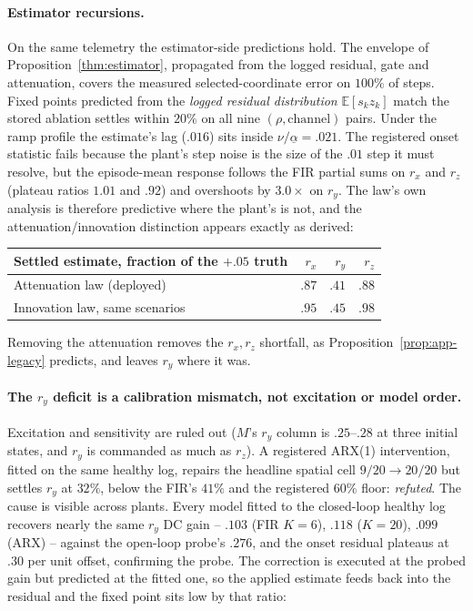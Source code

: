 \paragraph{Estimator recursions.}
On the same telemetry the estimator-side predictions hold. The envelope of
Proposition~\ref{thm:estimator}, propagated from the logged residual, gate
and attenuation, covers the measured selected-coordinate error on $100\%$ of
steps. Fixed points predicted from the \emph{logged residual distribution}
$\mathbb E[s_kz_k]$ match the stored ablation settles within $20\%$ on all
nine $(\rho,\text{channel})$ pairs. Under the ramp profile the estimate's lag
($.016$) sits inside $\nu/\underline\alpha=.021$. The registered onset
statistic fails because the plant's step noise is the size of the $.01$ step
it must resolve, but the episode-mean response follows the FIR partial sums
on $r_x$ and $r_z$ (plateau ratios $1.01$ and $.92$) and overshoots by
$3.0\times$ on $r_y$. The law's own analysis is therefore predictive where
the plant's is not, and the attenuation/innovation distinction appears
exactly as derived:

\begin{center}\small
\begin{tabular}{lrrr}
\toprule
Settled estimate, fraction of the $+.05$ truth & $r_x$ & $r_y$ & $r_z$\\
\midrule
Attenuation law (deployed) & $.87$ & $.41$ & $.88$\\
Innovation law, same scenarios & $.95$ & $.45$ & $.98$\\
\bottomrule
\end{tabular}
\end{center}
Removing the attenuation removes the $r_x,r_z$ shortfall, as
Proposition~\ref{prop:app-legacy} predicts, and leaves $r_y$ where it was.

\paragraph{The $r_y$ deficit is a calibration mismatch, not excitation or model order.}
Excitation and sensitivity are ruled out ($M$'s $r_y$ column is $.25$--$.28$
at three initial states, and $r_y$ is commanded as much as $r_z$). A
registered ARX(1) intervention, fitted on the same healthy log, repairs the
headline spatial cell $9/20\to20/20$ but settles $r_y$ at $32\%$, below the
FIR's $41\%$ and the registered $60\%$ floor: \emph{refuted}. The cause is
visible across plants. Every model fitted to the closed-loop healthy log
recovers nearly the same $r_y$ DC gain -- $.103$ (FIR $K{=}6$), $.118$
($K{=}20$), $.099$ (ARX) -- against the open-loop probe's $.276$, and the
onset residual plateaus at $.30$ per unit offset, confirming the probe. The
correction is executed at the probed gain but predicted at the fitted one, so
the applied estimate feeds back into the residual and the fixed point sits
low by that ratio:

